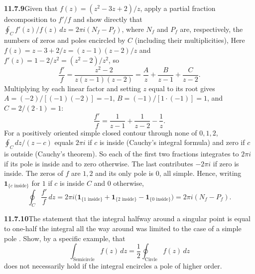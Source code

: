 \par\bigskip
\noindent\textbf{11.7.9}\quad Given that $f(z)=(z^{2}-3z+2)/z$, apply a
partial fraction decomposition to $f'/f$ and show directly that
$\oint_{C}f'(z)/f(z)\,dz=2\pi i(N_{f}-P_{f})$, where $N_{f}$ and $P_{f}$ are,
respectively, the numbers of zeros and poles encircled by $C$ (including
their multiplicities), 
\solution
Here $f(z)=z-3+2/z=(z-1)(z-2)/z$ and $f'(z)=1-2/z^2=(z^2-2)/z^2$, so
\[
\frac{f'}f=\frac{z^2-2}{z(z-1)(z-2)}
=\frac Az+\frac B{z-1}+\frac C{z-2}.
\]
Multiplying by each linear factor and setting $z$ equal to its root
gives $A=(-2)/[(-1)(-2)]=-1$, $B=(-1)/[1\cdot(-1)]=1$, and
$C=2/(2\cdot1)=1$:
\[
\frac{f'}f=\frac1{z-1}+\frac1{z-2}-\frac1z.
\]
For a positively oriented simple closed contour through none of
$0,1,2$, $\oint_C dz/(z-c)$ equals $2\pi i$ if $c$ is inside (Cauchy's
integral formula) and zero if $c$ is outside (Cauchy's theorem). So
each of the first two fractions integrates to $2\pi i$
if its pole is inside and to zero otherwise. The last contributes
$-2\pi i$ if zero is inside. The zeros of $f$ are $1,2$ and its only
pole is $0$, all simple. Hence, writing $\mathbf1_{\{c\text{ inside}\}}$
for $1$ if $c$ is inside $C$ and $0$ otherwise,
\[
\boxed{\oint_C\frac{f'}f\,dz
=2\pi i\bigl(\mathbf1_{\{1\text{ inside}\}}
+\mathbf1_{\{2\text{ inside}\}}-\mathbf1_{\{0\text{ inside}\}}\bigr)
=2\pi i(N_f-P_f)}.
\]

\par\bigskip
\noindent\textbf{11.7.10}\quad The statement that the integral halfway
around a singular point is equal to one-half the integral all the way
around was limited to the case of a simple pole . Show, by a specific example, that
\[
\int_{\text{Semicircle}}f(z)\,dz
=\frac{1}{2}\oint_{\text{Circle}}f(z)\,dz
\]
does not necessarily hold if the integral encircles a pole of higher order.

